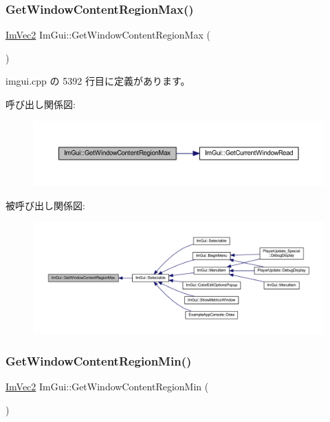 \subsubsection{\texorpdfstring{Get\+Window\+Content\+Region\+Max()}{GetWindowContentRegionMax()}}
{\footnotesize\ttfamily \mbox{\hyperlink{struct_im_vec2}{Im\+Vec2}} Im\+Gui\+::\+Get\+Window\+Content\+Region\+Max (\begin{DoxyParamCaption}{ }\end{DoxyParamCaption})}



 imgui.\+cpp の 5392 行目に定義があります。

呼び出し関係図\+:\nopagebreak
\begin{figure}[H]
\begin{center}
\leavevmode
\includegraphics[width=350pt]{namespace_im_gui_a96ce6060592d3ef975594357e650adc6_cgraph}
\end{center}
\end{figure}
被呼び出し関係図\+:\nopagebreak
\begin{figure}[H]
\begin{center}
\leavevmode
\includegraphics[width=350pt]{namespace_im_gui_a96ce6060592d3ef975594357e650adc6_icgraph}
\end{center}
\end{figure}
\mbox{\label{namespace_im_gui_a790123aa15c266798f35050ba36b7197}} 
\subsubsection{\texorpdfstring{Get\+Window\+Content\+Region\+Min()}{GetWindowContentRegionMin()}}
{\footnotesize\ttfamily \mbox{\hyperlink{struct_im_vec2}{Im\+Vec2}} Im\+Gui\+::\+Get\+Window\+Content\+Region\+Min (\begin{DoxyParamCaption}{ }\end{DoxyParamCaption})}



